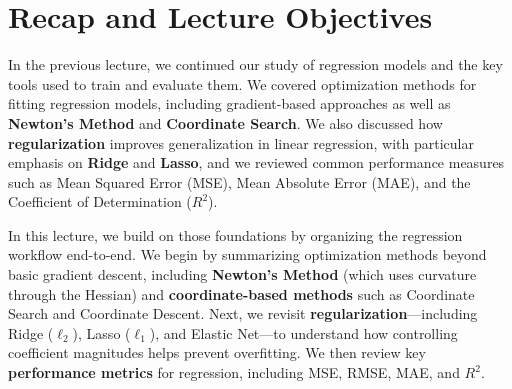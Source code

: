 \documentclass{article}
\begin{document}





\section{Recap and Lecture Objectives}

In the previous lecture, we continued our study of regression models and the key tools used to train and evaluate them. We covered optimization methods for fitting regression models, including gradient-based approaches as well as \textbf{Newton’s Method} and \textbf{Coordinate Search}. We also discussed how \textbf{regularization} improves generalization in linear regression, with particular emphasis on \textbf{Ridge} and \textbf{Lasso}, and we reviewed common performance measures such as Mean Squared Error (MSE), Mean Absolute Error (MAE), and the Coefficient of Determination ($R^2$).

In this lecture, we build on those foundations by organizing the regression workflow end-to-end. We begin by summarizing optimization methods beyond basic gradient descent, including \textbf{Newton’s Method} (which uses curvature through the Hessian) and \textbf{coordinate-based methods} such as Coordinate Search and Coordinate Descent. Next, we revisit \textbf{regularization}—including Ridge ($\ell_2$), Lasso ($\ell_1$), and Elastic Net—to understand how controlling coefficient magnitudes helps prevent overfitting. We then review key \textbf{performance metrics} for regression, including MSE, RMSE, MAE, and $R^2$.
\end{document}
